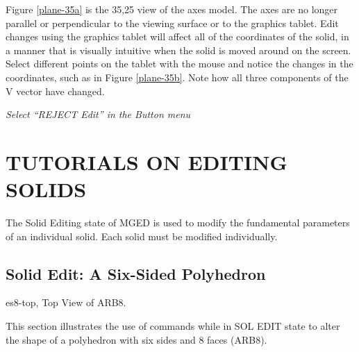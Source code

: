 
Figure \ref{plane-35a} is the 35,25 view of the axes model.
The axes are no longer 
parallel or perpendicular to the viewing surface or to the graphics tablet.
Edit changes using the graphics tablet will affect all of the coordinates of
the solid, in a manner that is visually intuitive when the solid
is moved around on the screen.
Select different points on the tablet with the mouse and notice the 
changes in the coordinates, such as in Figure \ref{plane-35b}.
Note how all three components of the V vector have changed.

{\em Select ``REJECT Edit'' in the Button menu}
\chapter{TUTORIALS ON EDITING SOLIDS}

The Solid Editing state of MGED is used to modify the fundamental
parameters of an individual solid.
Each solid must be modified individually.

\section{Solid Edit: A Six-Sided Polyhedron}
\mfig es8-top, Top View of ARB8.

This section illustrates the use of commands while in
SOL EDIT state to alter the
shape of a polyhedron with six sides and 8 faces (ARB8).


